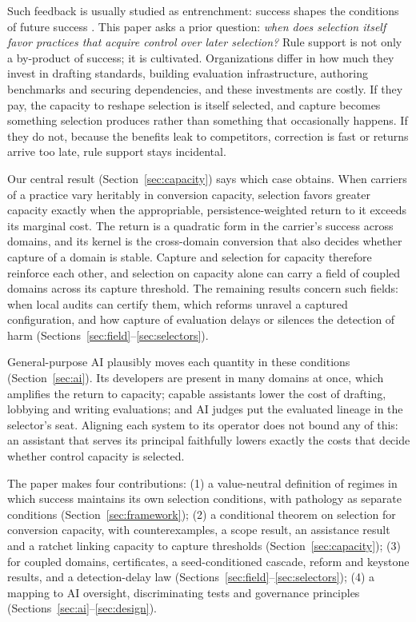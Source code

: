 \documentclass[letterpaper]{article} %
\theoremstyle{definition}
\begin{document}
Such feedback is usually studied as entrenchment: success shapes the conditions of future success \citep{arthur1989,pierson2000,acemoglu2008,hardt2022}. This paper asks a prior question: \emph{when does selection itself favor practices that acquire control over later selection?} Rule support is not only a by-product of success; it is cultivated. Organizations differ in how much they invest in drafting standards, building evaluation infrastructure, authoring benchmarks and securing dependencies, and these investments are costly. If they pay, the capacity to reshape selection is itself selected, and capture becomes something selection produces rather than something that occasionally happens. If they do not, because the benefits leak to competitors, correction is fast or returns arrive too late, rule support stays incidental.

Our central result (Section~\ref{sec:capacity}) says which case obtains. When carriers of a practice vary heritably in conversion capacity, selection favors greater capacity exactly when the appropriable, persistence-weighted return to it exceeds its marginal cost. The return is a quadratic form in the carrier's success across domains, and its kernel is the cross-domain conversion that also decides whether capture of a domain is stable. Capture and selection for capacity therefore reinforce each other, and selection on capacity alone can carry a field of coupled domains across its capture threshold. The remaining results concern such fields: when local audits can certify them, which reforms unravel a captured configuration, and how capture of evaluation delays or silences the detection of harm (Sections~\ref{sec:field}--\ref{sec:selectors}).

General-purpose AI plausibly moves each quantity in these conditions (Section~\ref{sec:ai}). Its developers are present in many domains at once, which amplifies the return to capacity; capable assistants lower the cost of drafting, lobbying and writing evaluations; and AI judges put the evaluated lineage in the selector's seat. Aligning each system to its operator does not bound any of this: an assistant that serves its principal faithfully lowers exactly the costs that decide whether control capacity is selected.

The paper makes four contributions: (1) a value-neutral definition of regimes in which success maintains its own selection conditions, with pathology as separate conditions (Section~\ref{sec:framework}); (2) a conditional theorem on selection for conversion capacity, with counterexamples, a scope result, an assistance result and a ratchet linking capacity to capture thresholds (Section~\ref{sec:capacity}); (3) for coupled domains, certificates, a seed-conditioned cascade, reform and keystone results, and a detection-delay law (Sections~\ref{sec:field}--\ref{sec:selectors}); (4) a mapping to AI oversight, discriminating tests and governance principles (Sections~\ref{sec:ai}--\ref{sec:design}).
\end{document}
